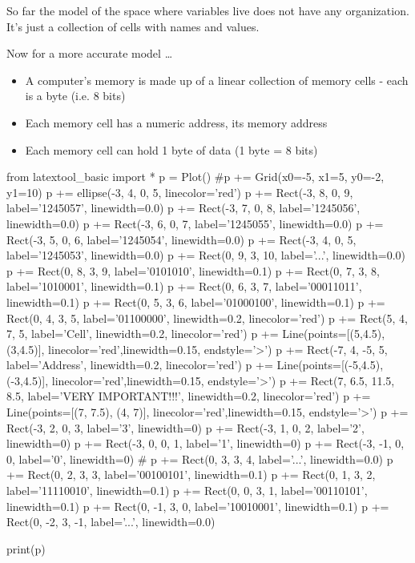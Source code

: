 So far the model of the space where variables live does not have any organization. It's just a collection of cells with names and values.

Now for a more accurate model \ldots{}

\begin{itemize}
\item
  A computer's memory is made up of a linear collection of memory cells
  - each is a byte (i.e. 8 bits)
\item
  Each memory cell has a numeric address, its memory address
\item
  Each memory cell can hold 1 byte of data (1 byte = 8 bits)
\end{itemize}

\begin{python}
from latextool_basic import *
p = Plot()
#p += Grid(x0=-5, x1=5, y0=-2, y1=10)
p += ellipse(-3, 4, 0, 5, linecolor='red')
p += Rect(-3, 8, 0, 9, label='1245057', linewidth=0.0)
p += Rect(-3, 7, 0, 8, label='1245056', linewidth=0.0)
p += Rect(-3, 6, 0, 7, label='1245055', linewidth=0.0)
p += Rect(-3, 5, 0, 6, label='1245054', linewidth=0.0)
p += Rect(-3, 4, 0, 5, label='1245053', linewidth=0.0)
p += Rect(0, 9, 3, 10, label='...', linewidth=0.0)
p += Rect(0, 8, 3, 9, label='0101010', linewidth=0.1)
p += Rect(0, 7, 3, 8, label='1010001', linewidth=0.1)
p += Rect(0, 6, 3, 7, label='00011011', linewidth=0.1)
p += Rect(0, 5, 3, 6, label='01000100', linewidth=0.1)
p += Rect(0, 4, 3, 5, label='01100000', linewidth=0.2, linecolor='red')
p += Rect(5, 4, 7, 5, label='Cell', linewidth=0.2, linecolor='red')
p += Line(points=[(5,4.5), (3,4.5)], linecolor='red',linewidth=0.15, endstyle='>')
p += Rect(-7, 4, -5, 5, label='Address', linewidth=0.2, linecolor='red')
p += Line(points=[(-5,4.5),(-3,4.5)], linecolor='red',linewidth=0.15, endstyle='>')
p += Rect(7, 6.5, 11.5, 8.5, label='VERY IMPORTANT!!!', linewidth=0.2, linecolor='red')
p += Line(points=[(7, 7.5), (4, 7)], linecolor='red',linewidth=0.15, endstyle='>')
p += Rect(-3, 2, 0, 3, label='3', linewidth=0)
p += Rect(-3, 1, 0, 2, label='2', linewidth=0)
p += Rect(-3, 0, 0, 1, label='1', linewidth=0)
p += Rect(-3, -1, 0, 0, label='0', linewidth=0)
#
p += Rect(0, 3, 3, 4, label='...', linewidth=0.0)
p += Rect(0, 2, 3, 3, label='00100101', linewidth=0.1)
p += Rect(0, 1, 3, 2, label='11110010', linewidth=0.1)
p += Rect(0, 0, 3, 1, label='00110101', linewidth=0.1)
p += Rect(0, -1, 3, 0, label='10010001', linewidth=0.1)
p += Rect(0, -2, 3, -1, label='...', linewidth=0.0)

print(p)
\end{python}

